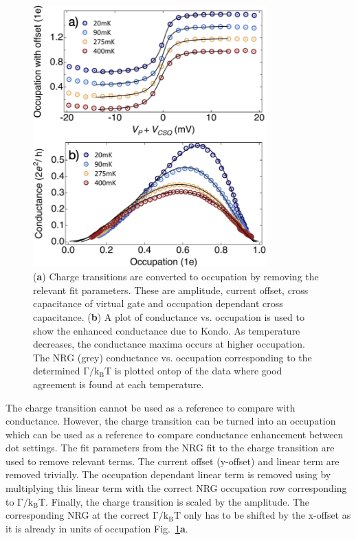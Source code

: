 \begin{figure}[!bht]
  \begin{center}
    \includegraphics[width=0.8\textwidth]{figures/ch3/crop_FiguresMaster.014.png}
    \caption[Method to determine occupation and plot conductance vs. occupation]{\label{fig:ch3/cond_vs_occ_gf} 
    (\textbf{a}) Charge transitions are converted to occupation by removing the relevant fit parameters. These are amplitude, current offset, cross capacitance of virtual gate and occupation dependant cross capacitance. (\textbf{b}) A plot of conductance vs. occupation is used to show the enhanced conductance due to Kondo. As temperature decreases, the conductance maxima occurs at higher occupation. The NRG (grey) conductance vs. occupation corresponding to the determined $\mathrm{\Gamma/k_BT}$ is plotted ontop of the data where good agreement is found at each temperature.}
  \end{center}
\end{figure}

The charge transition cannot be used as a reference to compare with conductance. However, the charge transition can be turned into an occupation which can be used as a reference to compare conductance enhancement between dot settings. The fit parameters from the NRG fit to the charge transition are used to remove relevant terms. The current offset (y-offset) and linear term are removed trivially. The occupation dependant linear term is removed using by multiplying this linear term with the correct NRG occupation row corresponding to $\mathrm{\Gamma/k_BT}$. Finally, the charge transition is scaled by the amplitude. The corresponding NRG at the correct $\mathrm{\Gamma/k_BT}$ only has to be shifted by the x-offset as it is already in units of occupation Fig.~\ref{fig:ch3/cond_vs_occ_gf}\textbf{a}.


